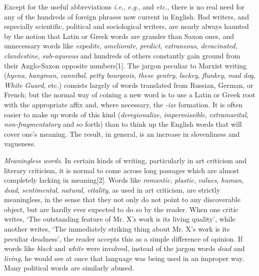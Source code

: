 Except for the useful abbreviations \textit{i.e}., \textit{e.g.}, and \textit{etc.}, there is no real need for any of the hundreds of foreign phrases now current in English. Bad writers, and especially scientific, political and sociological writers, are nearly always haunted by the notion that Latin or Greek words are grander than Saxon ones, and unnecessary words like \textit{expedite}, \textit{ameliorate}, \textit{predict}, \textit{extraneous}, \textit{deracinated}, \textit{clandestine}, \textit{sub-aqueous} and hundreds of others constantly gain ground from their Anglo-Saxon opposite numbers[1]. The jargon peculiar to Marxist writing (\textit{hyena}, \textit{hangman}, \textit{cannibal}, \textit{petty bourgeois}, \textit{these gentry}, \textit{lackey}, \textit{flunkey}, \textit{mad dog}, \textit{White Guard}, etc.) consists largely of words translated from Russian, German, or French; but the normal way of coining a new word is to use a Latin or Greek root with the appropriate affix and, where necessary, the \textit{-ize} formation. It is often easier to make up words of this kind (\textit{deregionalize}, \textit{impermissible}, \textit{extramarital}, \textit{non-fragmentatory} and so forth) than to think up the English words that will cover one’s meaning. The result, in general, is an increase in slovenliness and vagueness.\par

\textit{Meaningless words}. In certain kinds of writing, particularly in art criticism and literary criticism, it is normal to come across long passages which are almost completely lacking in meaning[2]. Words like \textit{romantic}, \textit{plastic}, \textit{values}, \textit{human}, \textit{dead}, \textit{sentimental}, \textit{natural}, \textit{vitality}, as used in art criticism, are strictly meaningless, in the sense that they not only do not point to any discoverable object, but are hardly ever expected to do so by the reader. When one critic writes, ‘The outstanding feature of Mr. X’s work is its living quality’, while another writes, ‘The immediately striking thing about Mr. X’s work is its peculiar deadness’, the reader accepts this as a simple difference of opinion. If words like \textit{black }and \textit{white} were involved, instead of the jargon words \textit{dead }and \textit{living}, he would see at once that language was being used in an improper way. Many political words are similarly abused.\par

